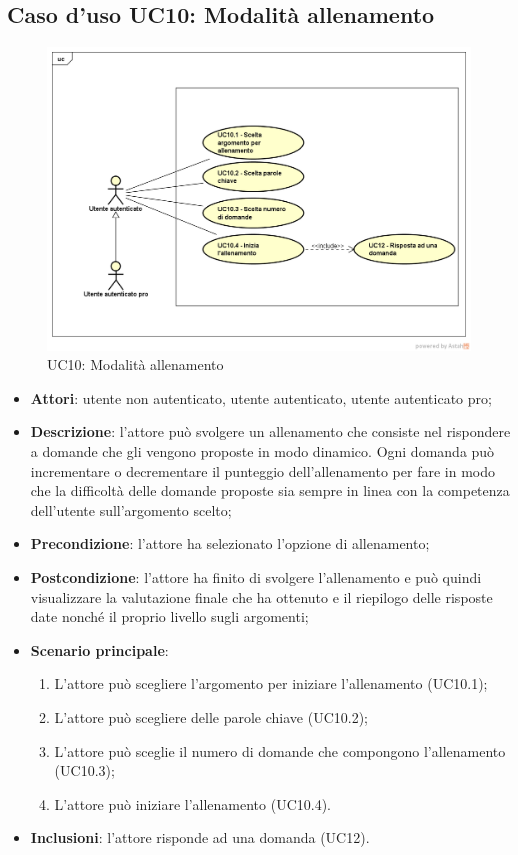 \newpage
\subsection{Caso d'uso UC10: Modalità allenamento}
\label{UC10}
	\begin{figure}
	\centering
	\includegraphics[scale=0.5]{UML/UC10.png}
	\caption{UC10: Modalità allenamento}
	\end{figure}
\FloatBarrier
\begin{itemize}
\item\textbf{Attori}: utente non autenticato, utente autenticato, utente autenticato pro;
\item\textbf{Descrizione}: l'attore può svolgere un allenamento che consiste nel rispondere a domande che gli vengono proposte in modo dinamico. Ogni domanda può incrementare o decrementare il punteggio dell'allenamento per fare in modo che la difficoltà delle domande proposte sia sempre in linea con la competenza dell'utente sull'argomento scelto;
\item\textbf{Precondizione}: l'attore ha selezionato l'opzione di allenamento;
\item\textbf{Postcondizione}: l'attore ha finito di svolgere l'allenamento e può quindi visualizzare la valutazione finale che ha ottenuto e il riepilogo delle risposte date nonché il proprio livello sugli argomenti;
\item\textbf{Scenario principale}:
	\begin{enumerate}
		\item L'attore può scegliere l'argomento per iniziare l'allenamento (UC10.1);
		\item L'attore può scegliere delle parole chiave (UC10.2);
		\item L'attore può sceglie il numero di domande che compongono l'allenamento (UC10.3);
		\item L'attore può iniziare l'allenamento (UC10.4).
	\end{enumerate}
\item \textbf{Inclusioni}: l'attore risponde ad una domanda (UC12).
\end{itemize}

